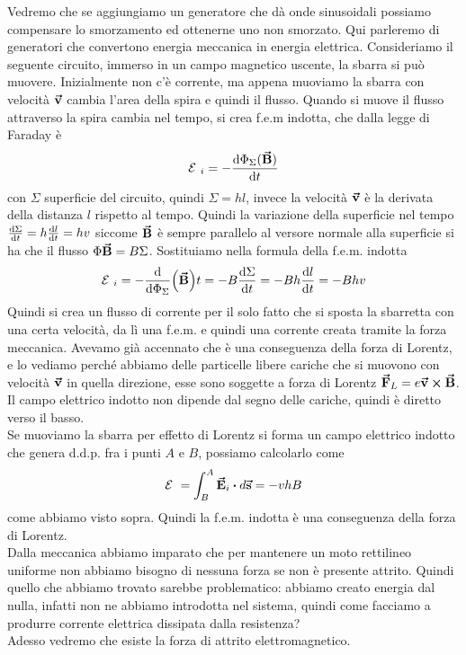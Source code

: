 Vedremo che se aggiungiamo un generatore che dà onde sinusoidali possiamo compensare lo smorzamento ed ottenerne uno non smorzato.
%
Qui parleremo di generatori che convertono energia meccanica in energia elettrica. Consideriamo il seguente circuito, immerso in un campo magnetico uscente, la sbarra si può muovere.
Inizialmente non c'è corrente, ma appena muoviamo la sbarra con velocità $\vb*{\va{v}}$ cambia l'area della spira e quindi il flusso. Quando si muove il flusso attraverso la spira cambia nel tempo, si crea f.e.m indotta, che dalla legge di Faraday è 
\begin{equation*}
	\mathcal{E}\ _i=-\dv{\Phi_\Sigma(\vb*{\va{B}})}{t}
\end{equation*}
con $\Sigma$ superficie del circuito, quindi $\Sigma=hl$, invece la velocità $\vb*{\va{v}}$ è la derivata della distanza $l$ rispetto al tempo. Quindi la variazione della superficie nel tempo $\dv{\Sigma}{t}=h\dv{l}{t}=hv$
siccome $\vb*{\va{B}}$ è sempre parallelo al versore normale alla superficie si ha che il flusso $\Phi\vb*{\va{B}}=B\Sigma$. Sostituiamo nella formula della f.e.m. indotta
\begin{equation*}
	\mathcal{E}\ _i=-\dv{\Phi_\Sigma}(\vb*{\va{B}}){t}=-B\dv{\Sigma}{t}=-Bh\dv{l}{t}=-Bhv
\end{equation*}
Quindi si crea un flusso di corrente per il solo fatto che si sposta la sbarretta con una certa velocità, da lì una f.e.m. e quindi una corrente creata tramite la forza meccanica. Avevamo già accennato che è una conseguenza della forza di Lorentz, e lo vediamo perché abbiamo delle particelle libere cariche che si muovono con velocità $\vb*{\va{v}}$ in quella direzione, esse sono soggette a forza di Lorentz $\vb*{\va{F}}_L=e\vb*{\va{v}}\cross\vb*{\va{B}}$. Il campo elettrico indotto non dipende dal segno delle cariche, quindi è diretto verso il basso.\\
Se muoviamo la sbarra per effetto di Lorentz si forma un campo elettrico indotto che genera d.d.p. fra i punti $A$ e $B$, possiamo calcolarlo come
\begin{equation*}
	\ee=\int^A_B\vba E_i\vdot d\vba s=-vhB
\end{equation*}
come abbiamo visto sopra. Quindi la f.e.m. indotta è una conseguenza della forza di Lorentz.\\

Dalla meccanica abbiamo imparato che per mantenere un moto rettilineo uniforme non abbiamo bisogno di nessuna forza se non è presente attrito. Quindi quello che abbiamo trovato sarebbe problematico: abbiamo creato energia dal nulla, infatti non ne abbiamo introdotta nel sistema, quindi come facciamo a produrre corrente elettrica dissipata dalla resistenza?\\
Adesso vedremo che esiste la forza di attrito elettromagnetico.

